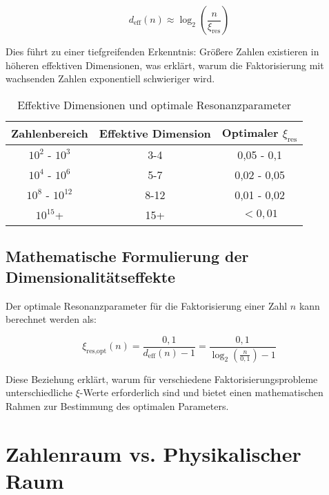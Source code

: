 \documentclass[12pt,a4paper]{article}
\newcommand{\xipar}{\ensuremath{\xi}}
\begin{document}
	\begin{equation}
		d_{\text{eff}}(n) \approx \log_2\left(\frac{n}{\xipar_{\text{res}}}\right)
	\end{equation}
	
	Dies führt zu einer tiefgreifenden Erkenntnis: Größere Zahlen existieren in höheren effektiven Dimensionen, was erklärt, warum die Faktorisierung mit wachsenden Zahlen exponentiell schwieriger wird.
	
	\begin{table}[htbp]
		\centering
		\begin{tabular}{ccc}
			\toprule
			\textbf{Zahlenbereich} & \textbf{Effektive Dimension} & \textbf{Optimaler $\xipar_{\text{res}}$} \\
			\midrule
			$10^2$ - $10^3$ & 3-4 & 0,05 - 0,1 \\
			$10^4$ - $10^6$ & 5-7 & 0,02 - 0,05 \\
			$10^8$ - $10^{12}$ & 8-12 & 0,01 - 0,02 \\
			$10^{15}$+ & 15+ & $<0,01$ \\
			\bottomrule
		\end{tabular}
		\caption{Effektive Dimensionen und optimale Resonanzparameter}
		\label{tab:effective_dimensions}
	\end{table}
	
	\subsection{Mathematische Formulierung der Dimensionalitätseffekte}
	\label{subsec:mathematical_formulation}
	
	Der optimale Resonanzparameter für die Faktorisierung einer Zahl $n$ kann berechnet werden als:
	
	\begin{equation}
		\xipar_{\text{res,opt}}(n) = \frac{0,1}{d_{\text{eff}}(n)-1} = \frac{0,1}{\log_2\left(\frac{n}{0,1}\right)-1}
	\end{equation}
	
	Diese Beziehung erklärt, warum für verschiedene Faktorisierungsprobleme unterschiedliche $\xipar$-Werte erforderlich sind und bietet einen mathematischen Rahmen zur Bestimmung des optimalen Parameters.
	
	\section{Zahlenraum vs. Physikalischer Raum}
	\label{sec:number_physical_space}
	
\end{document}
